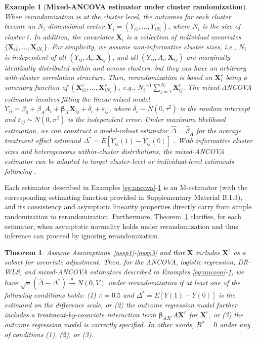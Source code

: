 \documentclass[12pt]{article}
\newtheorem{theorem}{Theorem}
\newtheorem{example}{Example}
\newcommand{\bX}{\boldsymbol{X}}\newcommand{\bO}{\boldsymbol{O}}
\newcommand{\bY}{\boldsymbol{Y}}
\newcommand{\bbeta}{\boldsymbol{\beta}}
\begin{document}
\begin{example}[\textbf{Mixed-ANCOVA estimator under cluster randomization}]\label{eg:mixed}
When rerandomization is at the cluster level, the outcomes for each cluster become an $N_i$-dimensional vector $\bY_i = (Y_{i1},\dots, Y_{iN_i})$, where $N_i$ is the size of cluster $i$. In addition, the covariates $\bX_i$ is a collection of individual covariates $\{\bX_{i1}, \dots, \bX_{iN_i}\}$. For simplicity, we assume non-informative cluster sizes, i.e., $N_i$ is independent of all $(Y_{ij}, A_i, \bX_{ij})$, and all $(Y_{ij}, A_i, \bX_{ij})$ are {marginally identically distributed within and across clusters}, but they can have an arbitrary with-cluster correlation structure. Then, rerandomization is based on $\bX_i^r$ being a summary function of $(\bX_{i1}^r,\dots, \bX_{iN_i}^r)$, e.g., ${N_i}^{-1} \sum_{j=1}^{N_i} \bX_{ij}^r$.
The mixed-ANCOVA estimator involves fitting the linear mixed model $Y_{ij} = {\beta}_0 + {\beta}_A A_i + {\bbeta}_X \bX_{ij} + \delta_i + \varepsilon_{ij}$, where $\delta_i \sim N(0,\tau^2)$ is the random intercept and $\varepsilon_{ij} \sim N(0,\sigma^2)$ is the independent error. Under maximum likelihood estimation, we can construct a model-robust estimator $\widehat{\Delta} = \widehat{\beta}_A$ for the average treatment effect estimand $\Delta^* = E[Y_{ij}(1)-Y_{ij}(0)]$ \citep{wang2021mixed}. 
{With informative cluster sizes and heterogeneous within-cluster distributions, the mixed-ANCOVA estimator can be adapted to target cluster-level or individual-level estimands following \cite{wang2023CRT}.}
\end{example}

Each estimator described in Examples \ref{eg:ancova}-\ref{eg:mixed} is an M-estimator (with the corresponding estimating function provided in Supplementary Material B.1.3), and its consistency and asymptotic linearity properties directly carry from simple randomization to rerandomization. Furthermore, Theorem~\ref{thm2} clarifies, for each estimator, when asymptotic normality holds under rerandomization and thus inference can proceed by ignoring rerandomization. 


\begin{theorem}\label{thm2}
    Assume Assumptions~\ref{assp1}-\ref{assp3} and that $\bX$ includes $\bX^r$ as a subset for covariate adjustment. Then, for the ANCOVA, logistic regression, DR-WLS, and mixed-ANCOVA estimators described in Examples \ref{eg:ancova}-\ref{eg:mixed}, we have $\sqrt{n}(\widehat{\Delta} - \Delta^*) \xrightarrow{d} N(0,V)$ under rerandomization if at least one of the following conditions holds: (1) $\pi = 0.5$ and $\Delta^* = E[Y(1)-Y(0)]$ is the estimand on the difference scale, or (2) the outcome regression model further includes a treatment-by-covariate interaction term $\bbeta_{AX^r}A\bX^r$ for $\bX^r$, or (3) the outcome regression model is correctly specified. In other words, $R^2=0$ under any of conditions (1), (2), or (3).
\end{theorem}
\end{document}
